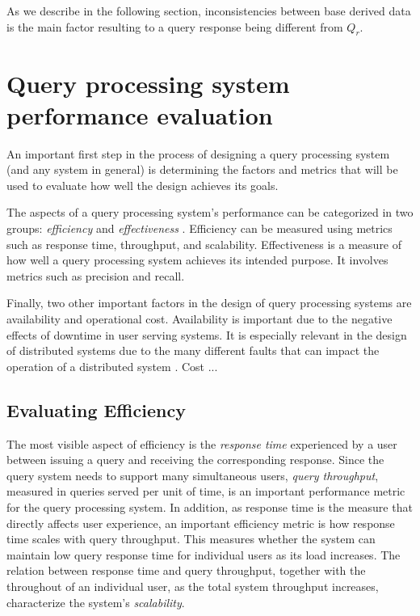 As we describe in the following section, inconsistencies between base derived data is the main factor
resulting to a query response being different from $Q_r$.


\section{Query processing system performance evaluation}
\label{sec:requirements}

An important first step in the process of designing a query processing system (and any system in general) is determining
the factors and metrics that will be used to evaluate how well the design achieves its goals.

The aspects of a query processing system's performance can be categorized in two groups:
\textit{efficiency} and \textit{effectiveness} \cite{buttcher:informationretrieval}.
Efficiency can be measured using metrics such as response time, throughput, and scalability.
Effectiveness is a measure of how well a query processing system achieves its intended purpose.
It involves metrics such as precision and recall.

Finally, two other important factors in the design of query processing systems are availability and operational cost.
Availability is important due to the negative effects of downtime in user serving systems.
It is especially relevant in the design of distributed systems due to the many different faults that can impact the
operation of a distributed system \cite{kleppmann:designing}.
Cost ...

\subsection{Evaluating Efficiency}

The most visible aspect of efficiency is the \textit{response time} experienced by a user between issuing a query and
receiving the corresponding response.
Since the query system needs to support many simultaneous users, \textit{query throughput}, measured in queries served
per unit of time, is an important performance metric for the query processing system.
In addition, as response time is the measure that directly affects user experience, an important efficiency metric is
how response time scales with query throughput.
This measures whether the system can maintain low query response time for individual users as its load increases.
The relation between response time and query throughput, together with the throughout of an individual user, as the
total system throughput increases, characterize the system's \textit{scalability}.

